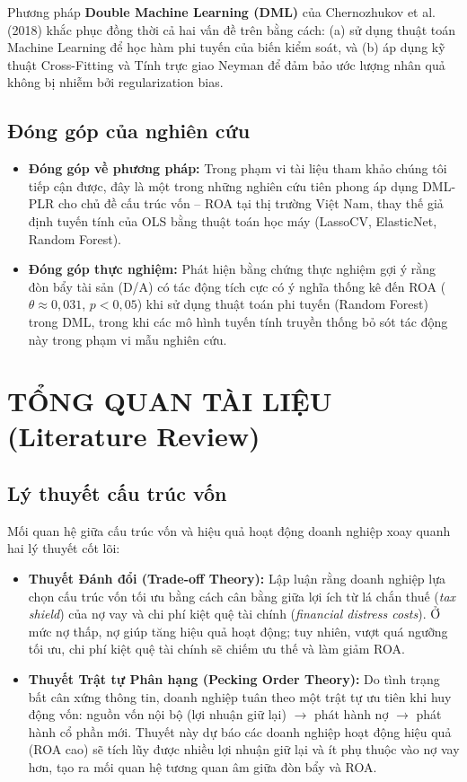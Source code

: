 \documentclass[12pt,a4paper]{article}
\begin{document}
Phương pháp \textbf{Double Machine Learning (DML)} của Chernozhukov et al. (2018) khắc phục đồng thời cả hai vấn đề trên bằng cách: (a) sử dụng thuật toán Machine Learning để học hàm phi tuyến của biến kiểm soát, và (b) áp dụng kỹ thuật Cross-Fitting và Tính trực giao Neyman để đảm bảo ước lượng nhân quả không bị nhiễm bởi regularization bias.

\subsection{Đóng góp của nghiên cứu}
\begin{itemize}
    \item \textbf{Đóng góp về phương pháp:} Trong phạm vi tài liệu tham khảo chúng tôi tiếp cận được, đây là một trong những nghiên cứu tiên phong áp dụng DML-PLR cho chủ đề cấu trúc vốn -- ROA tại thị trường Việt Nam, thay thế giả định tuyến tính của OLS bằng thuật toán học máy (LassoCV, ElasticNet, Random Forest).
    \item \textbf{Đóng góp thực nghiệm:} Phát hiện bằng chứng thực nghiệm gợi ý rằng đòn bẩy tài sản (D/A) có tác động tích cực có ý nghĩa thống kê đến ROA ($\theta \approx 0,031$, $p < 0,05$) khi sử dụng thuật toán phi tuyến (Random Forest) trong DML, trong khi các mô hình tuyến tính truyền thống bỏ sót tác động này trong phạm vi mẫu nghiên cứu.
\end{itemize}

\section{TỔNG QUAN TÀI LIỆU (Literature Review)}

\subsection{Lý thuyết cấu trúc vốn}
Mối quan hệ giữa cấu trúc vốn và hiệu quả hoạt động doanh nghiệp xoay quanh hai lý thuyết cốt lõi:
\begin{itemize}
    \item \textbf{Thuyết Đánh đổi (Trade-off Theory):} Lập luận rằng doanh nghiệp lựa chọn cấu trúc vốn tối ưu bằng cách cân bằng giữa lợi ích từ lá chắn thuế (\textit{tax shield}) của nợ vay và chi phí kiệt quệ tài chính (\textit{financial distress costs}). Ở mức nợ thấp, nợ giúp tăng hiệu quả hoạt động; tuy nhiên, vượt quá ngưỡng tối ưu, chi phí kiệt quệ tài chính sẽ chiếm ưu thế và làm giảm ROA.
    \item \textbf{Thuyết Trật tự Phân hạng (Pecking Order Theory):} Do tình trạng bất cân xứng thông tin, doanh nghiệp tuân theo một trật tự ưu tiên khi huy động vốn: nguồn vốn nội bộ (lợi nhuận giữ lại) $\rightarrow$ phát hành nợ $\rightarrow$ phát hành cổ phần mới. Thuyết này dự báo các doanh nghiệp hoạt động hiệu quả (ROA cao) sẽ tích lũy được nhiều lợi nhuận giữ lại và ít phụ thuộc vào nợ vay hơn, tạo ra mối quan hệ tương quan âm giữa đòn bẩy và ROA.
\end{itemize}
\end{document}
